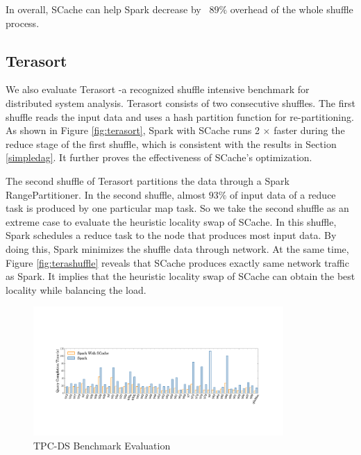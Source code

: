 In overall, SCache can help Spark decrease by ~$89\%$ overhead of the whole shuffle process. 

\subsection{Terasort}
We also evaluate Terasort \cite{spark-tera}-a recognized shuffle intensive benchmark for distributed system analysis.
Terasort consists of two consecutive shuffles. 
The first shuffle reads the input data and uses a hash partition function for re-partitioning. 
As shown in Figure \ref{fig:terasort}, Spark with SCache runs 2 $\times$ faster during the reduce stage of the first shuffle, which is consistent with the results in Section \ref{simpledag}. 
It further proves the effectiveness of SCache's optimization.

The second shuffle of Terasort partitions the data through a Spark RangePartitioner. 
In the second shuffle, almost $93\%$ of input data of a reduce task is produced by one particular map task. 
So we take the second shuffle as an extreme case to evaluate the heuristic locality swap of SCache.
In this shuffle, Spark schedules a reduce task to the node that produces most input data. 
By doing this, Spark minimizes the shuffle data through network. 
At the same time, Figure \ref{fig:terashuffle} reveals that SCache produces exactly same network traffic as Spark. 
It implies that the heuristic locality swap of SCache can obtain the best locality while balancing the load. 
\begin{figure}
	\includegraphics[width=0.85\textwidth]{fig/tpcds}
	\caption{TPC-DS Benchmark Evaluation}
	\label{fig:tpcds}
	\vspace{-1.2em}
\end{figure}
